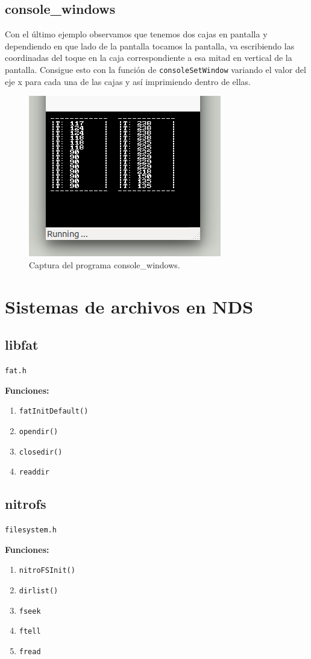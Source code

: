 \documentclass[12pt,english]{article}
\begin{document}
    
    \subsection{console\_windows}

    Con el último ejemplo observamos que tenemos dos cajas en pantalla y dependiendo en que lado de la pantalla tocamos la pantalla, va escribiendo las coordinadas del toque en la caja correspondiente a esa mitad en vertical de la pantalla. Consigue esto con la función de \texttt{consoleSetWindow} variando el valor del eje x para cada una de las cajas y así imprimiendo dentro de ellas.

    \begin{figure}[H] 
    \centering
    \includegraphics[scale=0.5]{images/console_windows}
    \caption{Captura del programa console\_windows.}
    \end{figure}

    \newpage

    \section{Sistemas de archivos en NDS}

    \subsection{libfat}

    \texttt{fat.h}

    \textbf{Funciones:}
    \begin{enumerate}
        \item \texttt{fatInitDefault()}
        \item \texttt{opendir()}
        \item \texttt{closedir()}
        \item \texttt{readdir}
    \end{enumerate}

    \subsection{nitrofs}
      
    \texttt{filesystem.h}

    \textbf{Funciones:}
    \begin{enumerate}
        \item \texttt{nitroFSInit()}
        \item \texttt{dirlist()}
        \item \texttt{fseek}
        \item \texttt{ftell}
        \item \texttt{fread}
    \end{enumerate}


    
    
\end{document}
